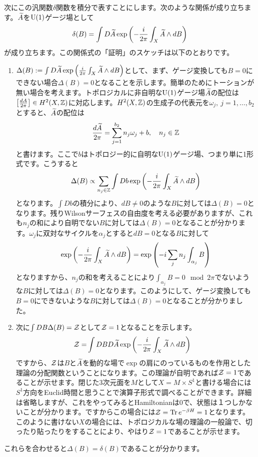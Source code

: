 \documentclass[generalized_symmetry.tex]{subfiles}
\begin{document}
次にこの汎関数$\delta$関数を積分で表すことにします。次のような関係が成り立ちます。$\widetilde{A}$を$\mbox{U}(1)$ゲージ場として
\begin{align}
  \delta(B) = \int D\widetilde{A} \exp\left(-\frac{i}{2\pi}\int_{X} \widetilde{A} \wedge dB\right)
  \label{integralBdelta}
\end{align}
が成り立ちます。この関係式の「証明」のスケッチは以下のとおりです。
\begin{enumerate}
  \item $\Delta(B):=\int D\widetilde{A} \exp\left(\frac{i}{2\pi}\int_{X} \widetilde{A} \wedge dB\right)$として、まず、ゲージ変換しても$B=0$にできない場合$\Delta(B)=0$となることを示します。簡単のためにトーションが無い場合を考えます。トポロジカルに非自明な$\mbox{U}(1)$ゲージ場$\widetilde{A}$の配位は$\left[\frac{dA}{2\pi}\right] \in H^2(X,\mathbb{Z})$に対応します。$H^2(X,\mathbb{Z})$の生成子の代表元を$\omega_j,\ j=1,\dots,b_2$とすると、$\widetilde{A}$の配位は
  \begin{align}
    \frac{d\widetilde{A}}{2\pi} = \sum_{j=1}^{b_2} n_j \omega_j + b,\quad n_j \in \mathbb{Z}
  \end{align}
  と書けます。ここで$b$はトポロジー的に自明な$\mbox{U}(1)$ゲージ場、つまり単に1形式です。こうすると
  \begin{align}
    \Delta(B) \propto \sum_{n_j \in \mathbb{Z}} \int Db \exp\left(-\frac{i}{2\pi}\int_{X} \widetilde{A} \wedge dB\right)
  \end{align}
  となります。$\int Db$の積分により、$dB\ne 0$のような$B$に対しては$\Delta(B)=0$となります。残りWilsonサーフェスの自由度を考える必要がありますが、これも$n_j$の和により自明でない$B$に対しては$\Delta(B)=0$となることが分かります。$\omega_j$に双対なサイクルを$\alpha_j$とすると$dB=0$となる$B$に対して
  \begin{align}
    \exp\left(-\frac{i}{2\pi}\int_{X} \widetilde{A} \wedge dB\right) = \exp\left(-i\sum_j n_j \int_{\alpha_j} B\right)
  \end{align}
  となりますから、$n_j$の和を考えることにより$\int_{\alpha_j} B =0 \mod 2\pi$でないような$B$に対しては$\Delta(B)=0$となります。このようにして、ゲージ変換しても$B=0$にできないような$B$に対しては$\Delta(B)=0$となることが分かりました。
  \item 次に$\int DB \Delta(B)=\mathcal{Z}$として$\mathcal{Z}=1$となることを示します。
  \begin{align}
    \mathcal{Z}=&\int DB D\widetilde{A} \exp\left(-\frac{i}{2\pi}\int_{X} \widetilde{A} \wedge dB\right)
  \end{align}
  ですから、$\mathcal{Z}$は$B$と$\widetilde{A}$を動的な場で$\exp$の肩にのっているものを作用とした理論の分配関数ということになります。この理論が自明であれば$\mathcal{Z}=1$であることが示せます。閉じた3次元面を$M$として$X=M \times S^1$と書ける場合には$S^1$方向をEuclid時間と思うことで演算子形式で調べることができます。詳細は省略しますが、これをやってみるとHamiltonianは$0$で、状態は１つしかないことが分かります。ですからこの場合には$\mathcal{Z}=\Tr e^{-\beta H}=1$となります。このように書けない$X$の場合には、トポロジカルな場の理論の一般論で、切ったり貼ったりをすることにより、やはり$\mathcal{Z}=1$であることが示せます。
\end{enumerate}
これらを合わせると$\Delta(B)=\delta(B)$であることが分かります。
\end{document}
